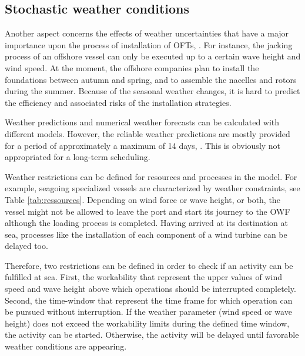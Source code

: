\subsection{Stochastic weather conditions}
Another aspect concerns the effects of weather uncertainties that have a major importance upon the process of installation of OFTs, \cite{COMPIT11}. For instance, the jacking process of an offshore vessel can only be executed up to a certain wave height and wind speed. At the moment, the offshore companies plan to install the foundations between autumn and spring, and to assemble the nacelles and rotors during the summer. Because of the seasonal weather changes, it is hard to predict the efficiency and associated risks of the installation strategies.

Weather predictions and numerical weather forecasts can be calculated with different models. However, the reliable weather predictions are mostly provided for a period of approximately a maximum of 14 days, \cite{hinnenthal2007}. This is obviously not appropriated for a long-term scheduling.

Weather restrictions can be defined for resources and processes in the model. For example, seagoing specialized vessels are characterized by weather constraints, see Table \ref{tab:ressources}. Depending on wind force or wave height, or both, the vessel might not be allowed to leave the port and start its journey to the OWF although the loading process is completed. Having arrived at its destination at sea, processes like the installation of each component of a wind turbine can be delayed too.

Therefore, two restrictions can be defined in order to check if an activity can be fulfilled at sea. First, the workability that represent the upper values of wind speed and wave height above which operations should be interrupted completely. Second, the time-window that represent the time frame for which operation can be pursued without interruption.  If the weather parameter (wind speed or wave height) does not exceed the workability limits during the defined time window, the activity can be started. Otherwise, the activity will be delayed until favorable weather conditions are appearing.

